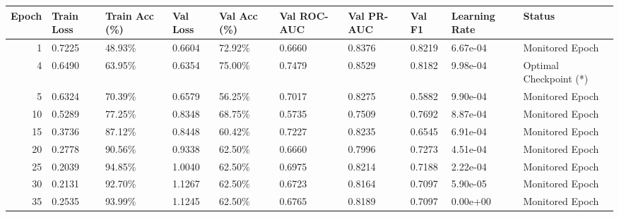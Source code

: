 \begin{tabular}{rlllllllll}
\toprule
Epoch & Train Loss & Train Acc (\%) & Val Loss & Val Acc (\%) & Val ROC-AUC & Val PR-AUC & Val F1 & Learning Rate & Status \\
\midrule
1 & 0.7225 & 48.93\% & 0.6604 & 72.92\% & 0.6660 & 0.8376 & 0.8219 & 6.67e-04 & Monitored Epoch \\
4 & 0.6490 & 63.95\% & 0.6354 & 75.00\% & 0.7479 & 0.8529 & 0.8182 & 9.98e-04 & Optimal Checkpoint (*) \\
5 & 0.6324 & 70.39\% & 0.6579 & 56.25\% & 0.7017 & 0.8275 & 0.5882 & 9.90e-04 & Monitored Epoch \\
10 & 0.5289 & 77.25\% & 0.8348 & 68.75\% & 0.5735 & 0.7509 & 0.7692 & 8.87e-04 & Monitored Epoch \\
15 & 0.3736 & 87.12\% & 0.8448 & 60.42\% & 0.7227 & 0.8235 & 0.6545 & 6.91e-04 & Monitored Epoch \\
20 & 0.2778 & 90.56\% & 0.9338 & 62.50\% & 0.6660 & 0.7996 & 0.7273 & 4.51e-04 & Monitored Epoch \\
25 & 0.2039 & 94.85\% & 1.0040 & 62.50\% & 0.6975 & 0.8214 & 0.7188 & 2.22e-04 & Monitored Epoch \\
30 & 0.2131 & 92.70\% & 1.1267 & 62.50\% & 0.6723 & 0.8164 & 0.7097 & 5.90e-05 & Monitored Epoch \\
35 & 0.2535 & 93.99\% & 1.1245 & 62.50\% & 0.6765 & 0.8189 & 0.7097 & 0.00e+00 & Monitored Epoch \\
\bottomrule
\end{tabular}

